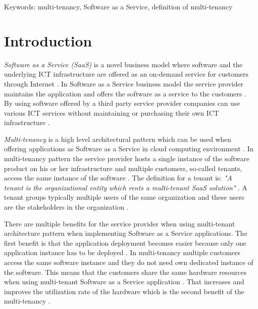 \documentclass[conference]{sasmoota2017}
\begin{document}

Keywords: multi-tenancy, Software as a Service, definition of multi-tenancy



\IEEEpeerreviewmaketitle



\section{Introduction}

\textit{Software as a Service (SaaS)} is a novel business model where software and the underlying ICT infrastructure are offered as an on-demand service for customers through Internet \cite{Bezemer:2010:MaintenanceDream}. In Software as a Service business model the service provider maintains the application and offers the software as a service to the customers \cite{Bezemer:2010:MaintenanceDream}. By using software offered by a third party service provider companies can use various ICT services without maintaining or purchasing their own ICT infrastructure \cite{Bezemer:2010:MaintenanceDream}. 

\textit{Multi-tenancy} is a high level architectural pattern which can be used when offering applications as Software as a Service in cloud computing environment \cite{Kabbedijk2015:Defining}. In multi-tenancy pattern the service provider hosts a single instance of the software product on his or her infrastructure and multiple customers, so-called tenants, access the same instance of the software \cite{Bezemer:2010:MaintenanceDream}. The definition for a tenant is: \textit{"A tenant is the organizational entity which rents a multi-tenant SaaS solution"} \cite{Bezemer:2010:MaintenanceDream}. A tenant groups typically multiple users of the same organization and these users are the stakeholders in the organization \cite{Bezemer:2010:MaintenanceDream}. 

There are multiple benefits for the service provider when using multi-tenant architecture pattern when implementing Software as a Service applications. The first benefit is that the application deployment becomes easier because only one application instance has to be deployed \cite{Bezemer:2010:MaintenanceDream}. In multi-tenancy multiple customers access the same software instance and they do not need own dedicated instance of the software. This means that the customers share the same hardware resources when using multi-tenant Software as a Service application \cite{Guo:2007:FrameworkForNative}. That increases and improves the utilization rate of the hardware which is the second benefit of the multi-tenancy \cite{Bezemer:2010:MaintenanceDream}. 
\end{document}

